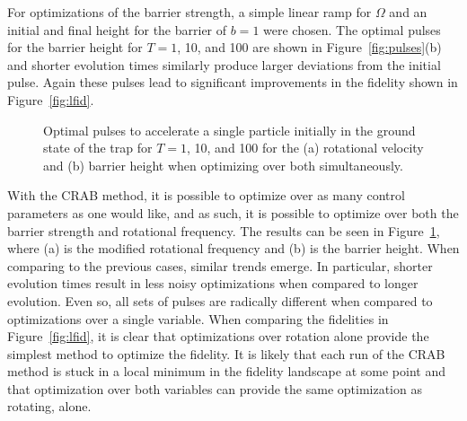 For optimizations of the barrier strength, a simple linear ramp for $\Omega$ and an initial and final height for the barrier of $b = 1$ were chosen.
The optimal pulses for the barrier height for $T=1$, 10, and 100 are shown in Figure~\ref{fig:pulses}(b) and shorter evolution times similarly produce larger deviations from the initial pulse.
Again these pulses lead to significant improvements in the fidelity shown in Figure~\ref{fig:lfid}.

\begin{figure} 
\centering
 \caption{
 Optimal pulses to accelerate a single particle initially in the ground state of the trap
 for $T = 1$, 10, and 100 for the (a) rotational velocity and (b) barrier height when optimizing over both simultaneously. }
 \label{fig:pulses_pair}
\end{figure}

With the CRAB method, it is possible to optimize over as many control parameters as one would like, and as such, it is possible to optimize over both the barrier strength and rotational frequency.
The results can be seen in Figure~\ref{fig:pulses_pair}, where (a) is the modified rotational frequency and (b) is the barrier height.
When comparing to the previous cases, similar trends emerge.
In particular, shorter evolution times result in less noisy optimizations when compared to longer evolution.
Even so, all sets of pulses are radically different when compared to optimizations over a single variable.
When comparing the fidelities in Figure~\ref{fig:lfid}, it is clear that optimizations over rotation alone provide the simplest method to optimize the fidelity.
It is likely that each run of the CRAB method is stuck in a local minimum in the fidelity landscape at some point and that optimization over both variables can provide the same optimization as rotating, alone.

